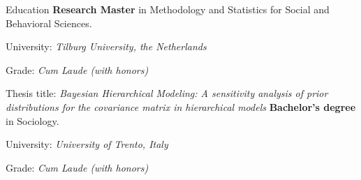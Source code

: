 \begin{rubric}{Education}
\entry*[2017 -- 2019]%
	\textbf{Research Master} in Methodology and Statistics for Social and Behavioral Sciences.
	\par University: \emph{Tilburg University, the Netherlands}
	\par Grade: \emph{Cum Laude (with honors)}
	\par Thesis title: \emph{Bayesian Hierarchical Modeling: A sensitivity analysis of prior distributions for the covariance matrix in hierarchical models}
\entry*[2014 -- 2017]%
	\textbf{Bachelor's degree} in Sociology.
	\par University: \emph{University of Trento, Italy}
	\par Grade: \emph{Cum Laude (with honors)}
\end{rubric}